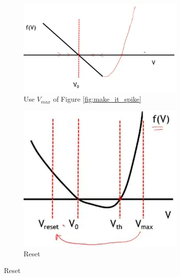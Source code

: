 \documentclass[]{article}
\begin{document}
\begin{figure}[H]
	\caption[How to make it excitable?]{How to make it excitable? Add an unstable fixed point.}
	\begin{subfigure}[b]{0.45\textwidth}
		\caption{Use $V_{max}$ of Figure \ref{fig:make_it_spike}}
		\includegraphics[width=0.9\textwidth]{how-excitable}
	\end{subfigure}
	\begin{subfigure}[b]{0.45\textwidth}
		\caption{Reset}
		\includegraphics[width=0.9\textwidth]{how-excitable1}
	\end{subfigure}
\end{figure}
\end{document}
